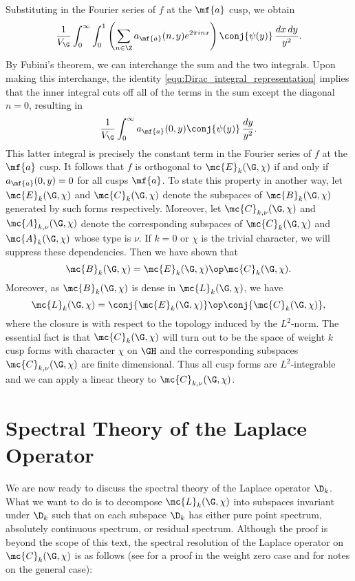     Substituting in the Fourier series of $f$ at the $\mf{a}$ cusp, we obtain
    \[
       \frac{1}{V_{\G}}\int_{0}^{\infty}\int_{0}^{1}\left(\sum_{n \in \Z}a_{\mf{a}}(n,y)e^{2\pi inx}\right)\conj{\psi(y)}\,\frac{dx\,dy}{y^{2}}.
    \]
    By Fubini's theorem, we can interchange the sum and the two integrals. Upon making this interchange, the identity \cref{equ:Dirac_integral_representation} implies that the inner integral cuts off all of the terms in the sum except the diagonal $n = 0$, resulting in
    \[
      \frac{1}{V_{\G}}\int_{0}^{\infty}a_{\mf{a}}(0,y)\conj{\psi(y)}\,\frac{dy}{y^{2}}.
    \]
    This latter integral is precisely the constant term in the Fourier series of $f$ at the $\mf{a}$ cusp. It follows that $f$ is orthogonal to $\mc{E}_{k}(\G,\chi)$ if and only if $a_{\mf{a}}(0,y) = 0$ for all cusps $\mf{a}$. To state this property in another way, let $\mc{E}_{k}(\G,\chi)$ and $\mc{C}_{k}(\G,\chi)$ denote the subspaces of $\mc{B}_{k}(\G,\chi)$ generated by such forms respectively. Moreover, let $\mc{C}_{k,\nu}(\G,\chi)$ and $\mc{A}_{k,\nu}(\G,\chi)$ denote the corresponding subspaces of $\mc{C}_{k}(\G,\chi)$ and $\mc{A}_{k}(\G,\chi)$ whose type is $\nu$. If $k = 0$ or $\chi$ is the trivial character, we will suppress these dependencies. Then we have shown that
    \[
      \mc{B}_{k}(\G,\chi) = \mc{E}_{k}(\G,\chi) \op \mc{C}_{k}(\G,\chi).
    \]
    Moreover, as $\mc{B}_{k}(\G,\chi)$ is dense in $\mc{L}_{k}(\G,\chi)$, we have
    \[
      \mc{L}_{k}(\G,\chi) = \conj{\mc{E}_{k}(\G,\chi)} \op \conj{\mc{C}_{k}(\G,\chi)},
    \]
    where the closure is with respect to the topology induced by the $L^{2}$-norm. The essential fact is that $\mc{C}_{k}(\G,\chi)$ will turn out to be the space of weight $k$ cusp forms with character $\chi$ on $\GH$ and the corresponding subspaces $\mc{C}_{k,\nu}(\G,\chi)$ are finite dimensional. Thus all cusp forms are $L^{2}$-integrable and we can apply a linear theory to $\mc{C}_{k,\nu}(\G,\chi)$.
  \section{Spectral Theory of the Laplace Operator}
    We are now ready to discuss the spectral theory of the Laplace operator $\D_{k}$. What we want to do is to decompose $\mc{L}_{k}(\G,\chi)$ into subspaces invariant under $\D_{k}$ such that on each subspace $\D_{k}$ has either pure point spectrum, absolutely continuous spectrum, or residual spectrum. Although the proof is beyond the scope of this text, the spectral resolution of the Laplace operator on $\mc{C}_{k}(\G,\chi)$ is as follows (see \cite{iwaniec2002spectral} for a proof in the weight zero case and \cite{duke2002subconvexity} for notes on the general case):

